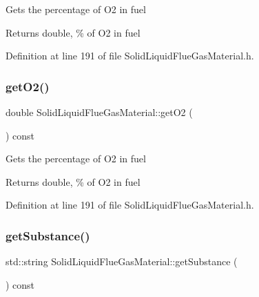 Gets the percentage of O2 in fuel \begin{DoxyReturn}{Returns}
double, \% of O2 in fuel 
\end{DoxyReturn}


Definition at line 191 of file Solid\+Liquid\+Flue\+Gas\+Material.\+h.

\mbox{\label{class_solid_liquid_flue_gas_material_a08d588e576f605d3f9925cb649e1105e}} 
\subsubsection{\texorpdfstring{get\+O2()}{getO2()}\hspace{0.1cm}{\footnotesize\ttfamily [3/3]}}
{\footnotesize\ttfamily double Solid\+Liquid\+Flue\+Gas\+Material\+::get\+O2 (\begin{DoxyParamCaption}{ }\end{DoxyParamCaption}) const\hspace{0.3cm}{\ttfamily [inline]}}

Gets the percentage of O2 in fuel \begin{DoxyReturn}{Returns}
double, \% of O2 in fuel 
\end{DoxyReturn}


Definition at line 191 of file Solid\+Liquid\+Flue\+Gas\+Material.\+h.

\mbox{\label{class_solid_liquid_flue_gas_material_a6e07a23fb05c15c7e5dba39334988de8}} 
\subsubsection{\texorpdfstring{get\+Substance()}{getSubstance()}\hspace{0.1cm}{\footnotesize\ttfamily [1/3]}}
{\footnotesize\ttfamily std\+::string Solid\+Liquid\+Flue\+Gas\+Material\+::get\+Substance (\begin{DoxyParamCaption}{ }\end{DoxyParamCaption}) const\hspace{0.3cm}{\ttfamily [inline]}}

